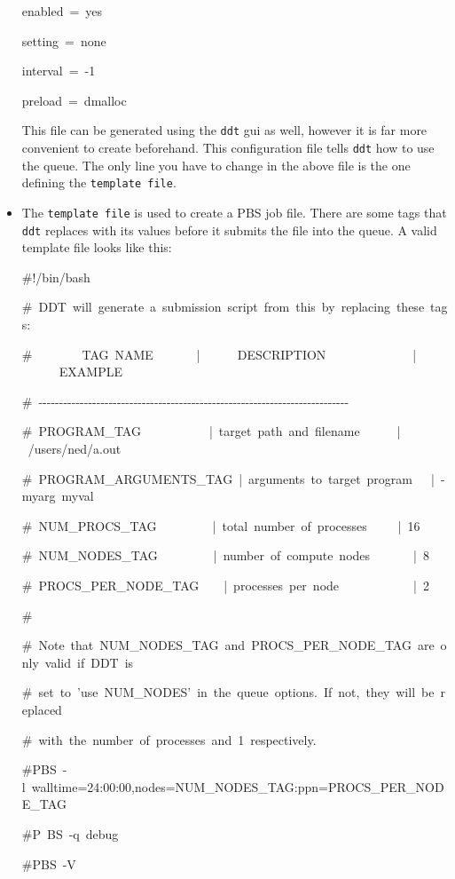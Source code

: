 \begin{itemize}
\begin{lyxcode}
enabled~=~yes~

setting~=~none~

interval~=~-1~

preload~=~dmalloc~
\end{lyxcode}
This file can be generated using the \texttt{ddt} gui as well, however
it is far more convenient to create beforehand. This configuration
file tells \texttt{ddt} how to use the queue. The only line you have
to change in the above file is the one defining the \texttt{template
file}.

\item The \texttt{template file} is used to create a PBS job file. There
are some tags that \texttt{ddt} replaces with its values before it
submits the file into the queue. A valid template file looks like
this:

\begin{lyxcode}
\#!/bin/bash

\#~DDT~will~generate~a~submission~script~from~this~by~replacing~these~tags:~

\#~~~~~~~~TAG~NAME~~~~~~~|~~~~~~DESCRIPTION~~~~~~~~~~~~~~|~~~~~~EXAMPLE~

\#~-{}-{}-{}-{}-{}-{}-{}-{}-{}-{}-{}-{}-{}-{}-{}-{}-{}-{}-{}-{}-{}-{}-{}-{}-{}-{}-{}-{}-{}-{}-{}-{}-{}-{}-{}-{}-{}-{}-{}-{}-{}-{}-{}-{}-{}-{}-{}-{}-{}-{}-{}-{}-{}-{}-{}-{}-{}-{}-{}-{}-{}-{}-{}-{}-{}-{}-{}-{}-{}-{}-{}-{}-{}-{}-~

\#~PROGRAM\_TAG~~~~~~~~~~~|~target~path~and~filename~~~~~~|~/users/ned/a.out~

\#~PROGRAM\_ARGUMENTS\_TAG~|~arguments~to~target~program~~~|~-myarg~myval~

\#~NUM\_PROCS\_TAG~~~~~~~~~|~total~number~of~processes~~~~~|~16~

\#~NUM\_NODES\_TAG~~~~~~~~~|~number~of~compute~nodes~~~~~~~|~8~

\#~PROCS\_PER\_NODE\_TAG~~~~|~processes~per~node~~~~~~~~~~~~|~2~

\#~

\#~Note~that~NUM\_NODES\_TAG~and~PROCS\_PER\_NODE\_TAG~are~only~valid~if~DDT~is~

\#~set~to~'use~NUM\_NODES'~in~the~queue~options.~If~not,~they~will~be~replaced~

\#~with~the~number~of~processes~and~1~respectively.

\#PBS~-l~walltime=24:00:00,nodes=NUM\_NODES\_TAG:ppn=PROCS\_PER\_NODE\_TAG~

\#P~BS~-q~debug~

\#PBS~-V~


\end{lyxcode}
\end{itemize}
